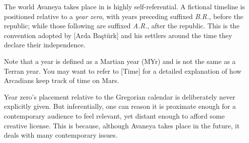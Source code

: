 
\startlines
The world Avaneya takes place in is highly self-referential. A fictional timeline is positioned relative to a {\it year zero}, with years preceding suffixed {\it B.R.}, before the republic; while those following are suffixed {\it A.R.}, after the republic. This is the convention adopted by [Arda Baştürk] and his settlers around the time they declare their independence.

Note that a year is defined as a Martian year (MYr) and is not the same as a Terran year. You may want to refer to [Time] for a detailed explanation of how Arcadians keep track of time on Mars.

Year zero's placement relative to the Gregorian calendar is deliberately never explicitly given. But inferentially, one can reason it is proximate enough for a contemporary audience to feel relevant, yet distant enough to afford some creative license. This is because, although Avaneya takes place in the future, it deals with many contemporary issues.
\crlf

\page 
\page 
\page 
\page 
\page 
\page 
\page 

\stoplines

\StopChapter


